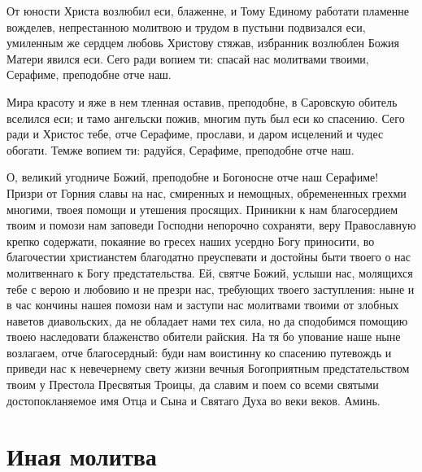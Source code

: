 \begin{mymulticols}



От юности Христа возлюбил еси, блаженне, и Тому Единому работати пламенне вожделев, непрестанною молитвою и трудом в пустыни подвизался еси, умиленным же сердцем любовь Христову стяжав, избранник возлюблен Божия Матери явился еси. Сего ради вопием ти: спасай нас молитвами твоими, Серафиме, преподобне отче наш.



Мира красоту и яже в нем тленная оставив, преподобне, в Саровскую обитель вселился еси; и тамо ангельски пожив, многим путь был еси ко спасению. Сего ради и Христос тебе, отче Серафиме, прослави, и даром исцелений и чудес обогати. Темже вопием ти: радуйся, Серафиме, преподобне отче наш.



О, великий угодниче Божий, преподобне и Богоносне отче наш Серафиме! Призри от Горния славы на нас, смиренных и немощных, обремененных грехми многими, твоея помощи и утешения просящих. Приникни к нам благосердием твоим и помози нам заповеди Господни непорочно сохраняти, веру Православную крепко содержати, покаяние во гресех наших усердно Богу приносити, во благочестии христианстем благодатно преуспевати и достойны быти твоего о нас молитвеннаго к Богу предстательства. Ей, святче Божий, услыши нас, молящихся тебе с верою и любовию и не презри нас, требующих твоего заступления: ныне и в час кончины нашея помози нам и заступи нас молитвами твоими от злобных наветов диавольских, да не обладает нами тех сила, но да сподобимся помощию твоею наследовати блаженство обители райския. На тя бо упование наше ныне возлагаем, отче благосердный: буди нам воистинну ко спасению путевождь и приведи нас к невечернему свету жизни вечныя Богоприятным предстательством твоим у Престола Пресвятыя Троицы, да славим и поем со всеми святыми достопокланяемое имя Отца и Сына и Святаго Духа во веки веков. Аминь.

\end{mymulticols}

\mychapterending





\section{Иная молитва}


